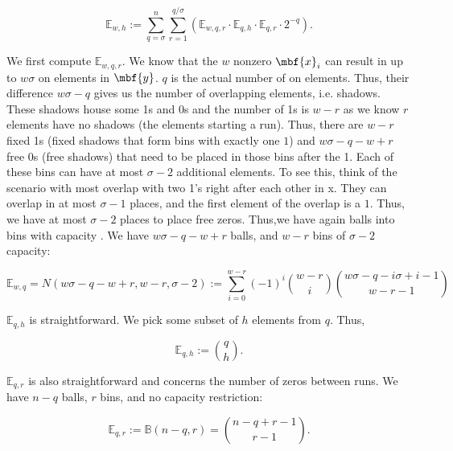 $$\mathbb{E}_{w,h} := \sum_{q=\sigma}^{n}\sum_{r=1}^{q/\sigma}\left(\mathbb{E}_{w,q,r} \cdot\mathbb{E}_{q,h}\cdot\mathbb{E}_{q,r}\cdot 2^{-q}\right).$$

We first compute $\mathbb{E}_{w,q,r}$. We know that the $w$ nonzero $\mbf{x}_i$ can result in up to $w\sigma$ on elements in $\mbf{y}$. $q$ is the actual number of on elements. Thus, their difference $w\sigma-q$ gives us the number of overlapping elements, i.e. shadows. These shadows house some 1s and 0s and the number of 1s is $w-r$ as we know $r$ elements have no shadows (the elements starting a run). Thus, there are $w-r$ fixed 1s (fixed shadows that form bins with exactly one $1$) and $w\sigma-q-w+r$ free 0s (free shadows) that need to be placed in those bins after the 1.  %
Each of these bins can have at most $\sigma-2$ additional elements. To see this, think of the scenario with most overlap with two 1's right after each other in x. They can overlap in at most $\sigma-1$ places, and the first element of the overlap is a $1$. Thus, we have at most $\sigma-2$ places to place free zeros. Thus,we have again balls into bins with capacity \cite{bro19}. We have $w\sigma-q-w+r$ balls, and $w-r$ bins of $\sigma-2$ capacity:

$$\mathbb{E}_{w,q}  = N(w\sigma-q-w+r, w-r, \sigma-2) := \sum_{i=0}^{w-r} (-1)^i {w-r \choose i} {w\sigma-q-i \sigma+i-1 \choose w-r-1}$$


\noindent $\mathbb{E}_{q,h}$ is straightforward. We pick some subset of $h$ elements from $q$. Thus,

$$\mathbb{E}_{q,h} := {q \choose h}.$$

\noindent $\mathbb{E}_{q,r}$ is also straightforward and concerns the number of zeros between runs. We have $n-q$ balls, $r$ bins, and no capacity restriction:

$$\mathbb{E}_{q,r} := \mathbb{B}(n-q,r) = {n-q+r-1 \choose r-1}.$$
\fi